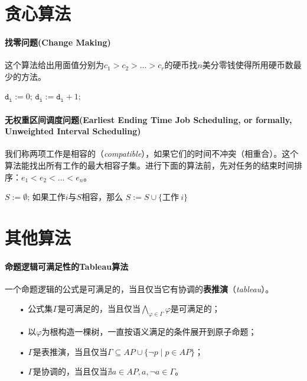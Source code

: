 \documentclass[b5paper,oneside]{ctexbook}
\begin{document}
\section{贪心算法}
\paragraph{找零问题(Change Making)}
  这个算法给出用面值分别为$c_1>c_2>\ldots>c_r$的硬币找$n$美分零钱使得所用硬币数最少的方法。
    \begin{algorithmic}
\State $\mathtt{d_i} := 0$;
\State $\mathtt{d_i} := \mathtt{d_i} + 1$;
\WhileDone
\ForDone
\EndB
\end{algorithmic}
\paragraph{无权重区间调度问题(Earliest Ending Time Job Scheduling, or formally, Unweighted Interval Scheduling)}
我们称两项工作是相容的（\emph{compatible}），如果它们的时间不冲突（相重合）。这个算法能找出所有工作的最大相容子集。进行下面的算法前，先对任务的结束时间排序：$e_1<e_2<\ldots <e_n$。
\begin{algorithmic}
\State $S:=\emptyset$;
\State 如果工作$i$与$S$相容，那么 $S:=S\cup\{\text{工作}\ i\}$
\ForDone
\EndB
\end{algorithmic}
\section{其他算法}
\paragraph{命题逻辑可满足性的Tableau算法}
一个命题逻辑的公式是可满足的，当且仅当它有协调的\textbf{表推演}（\textit{tableau}）。
\begin{enumerate}
\item[•]公式集$\Gamma$是可满足的，当且仅当$\bigwedge\limits_{\varphi\in\Gamma}\varphi$是可满足的；
\item[•]以$\varphi$为根构造一棵树，一直按语义满足的条件展开到原子命题；
\item[•]$\Gamma$是表推演，当且仅当$\Gamma\subseteq AP\cup\{\neg p\mid p\in AP\}$；
\item[•]$\Gamma$是协调的，当且仅当$\nexists a\in AP, a,\neg a\in\Gamma$。
\end{enumerate}
\end{document}
